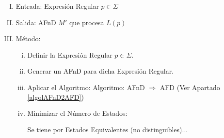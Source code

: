 \begin{enumerate}[I.]

\item Entrada: Expresión Regular $p \in \Sigma$

\item Salida: AFnD $M\prime$ que procesa $L(p)$

\item Método:
{
\begin{enumerate}[i.]
\item Definir la Expresión Regular $p \in \Sigma$.

\item Generar un AFnD para dicha Expresión Regular.

\item Aplicar el Algoritmo: Algoritmo: AFnD $\Rightarrow$ AFD (Ver Apartado \ref{algolAFnD2AFD})

\item Minimizar el Número de Estados:
{

 Se tiene por Estados Equivalentes (no distinguibles)...

}

\end{enumerate}

}

\end{enumerate}
